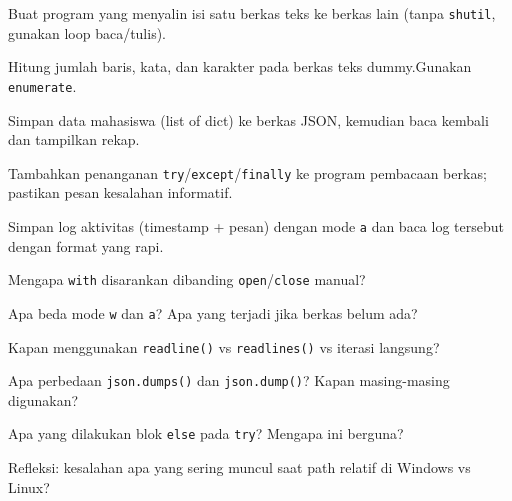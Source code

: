 \documentclass[../main.tex]{subfiles}
\begin{document}
\begin{aktivitas}
  \item Buat program yang menyalin isi satu berkas teks ke berkas lain (tanpa \texttt{shutil}, gunakan loop baca/tulis).
  \item Hitung jumlah baris, kata, dan karakter pada berkas teks dummy.\newline Gunakan \texttt{enumerate}.
  \item Simpan data mahasiswa (list of dict) ke berkas JSON, kemudian baca kembali dan tampilkan rekap.
  \item Tambahkan penanganan \texttt{try}/\texttt{except}/\texttt{finally} ke program pembacaan berkas; pastikan pesan kesalahan informatif.
  \item Simpan log aktivitas (timestamp + pesan) dengan mode \texttt{a} dan baca log tersebut dengan format yang rapi.
\end{aktivitas}

\begin{latihan}
  \item Mengapa \texttt{with} disarankan dibanding \texttt{open}/\texttt{close} manual?
  \item Apa beda mode \texttt{w} dan \texttt{a}? Apa yang terjadi jika berkas belum ada?
  \item Kapan menggunakan \texttt{readline()} vs \texttt{readlines()} vs iterasi langsung?
  \item Apa perbedaan \texttt{json.dumps()} dan \texttt{json.dump()}? Kapan masing-masing digunakan?
  \item Apa yang dilakukan blok \texttt{else} pada \texttt{try}? Mengapa ini berguna?
  \item Refleksi: kesalahan apa yang sering muncul saat path relatif di Windows vs Linux?
\end{latihan}
\end{document}
